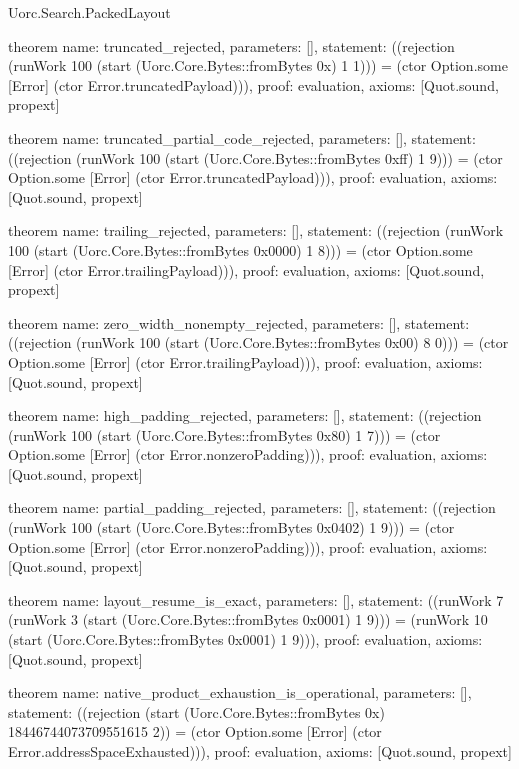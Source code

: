 \begin{lexlean}{Uorc.Search.PackedLayout}
\begin{semanticmodule}
theorem{
  name: truncated_rejected,
  parameters: [],
  statement: ((rejection (runWork 100 (start (Uorc.Core.Bytes::fromBytes 0x) 1 1))) = (ctor Option.some [Error] (ctor Error.truncatedPayload))),
  proof: evaluation{},
  axioms: [Quot.sound, propext]
}

theorem{
  name: truncated_partial_code_rejected,
  parameters: [],
  statement: ((rejection (runWork 100 (start (Uorc.Core.Bytes::fromBytes 0xff) 1 9))) = (ctor Option.some [Error] (ctor Error.truncatedPayload))),
  proof: evaluation{},
  axioms: [Quot.sound, propext]
}

theorem{
  name: trailing_rejected,
  parameters: [],
  statement: ((rejection (runWork 100 (start (Uorc.Core.Bytes::fromBytes 0x0000) 1 8))) = (ctor Option.some [Error] (ctor Error.trailingPayload))),
  proof: evaluation{},
  axioms: [Quot.sound, propext]
}

theorem{
  name: zero_width_nonempty_rejected,
  parameters: [],
  statement: ((rejection (runWork 100 (start (Uorc.Core.Bytes::fromBytes 0x00) 8 0))) = (ctor Option.some [Error] (ctor Error.trailingPayload))),
  proof: evaluation{},
  axioms: [Quot.sound, propext]
}

theorem{
  name: high_padding_rejected,
  parameters: [],
  statement: ((rejection (runWork 100 (start (Uorc.Core.Bytes::fromBytes 0x80) 1 7))) = (ctor Option.some [Error] (ctor Error.nonzeroPadding))),
  proof: evaluation{},
  axioms: [Quot.sound, propext]
}

theorem{
  name: partial_padding_rejected,
  parameters: [],
  statement: ((rejection (runWork 100 (start (Uorc.Core.Bytes::fromBytes 0x0402) 1 9))) = (ctor Option.some [Error] (ctor Error.nonzeroPadding))),
  proof: evaluation{},
  axioms: [Quot.sound, propext]
}

theorem{
  name: layout_resume_is_exact,
  parameters: [],
  statement: ((runWork 7 (runWork 3 (start (Uorc.Core.Bytes::fromBytes 0x0001) 1 9))) = (runWork 10 (start (Uorc.Core.Bytes::fromBytes 0x0001) 1 9))),
  proof: evaluation{},
  axioms: [Quot.sound, propext]
}

theorem{
  name: native_product_exhaustion_is_operational,
  parameters: [],
  statement: ((rejection (start (Uorc.Core.Bytes::fromBytes 0x) 18446744073709551615 2)) = (ctor Option.some [Error] (ctor Error.addressSpaceExhausted))),
  proof: evaluation{},
  axioms: [Quot.sound, propext]
}
\end{semanticmodule}
\end{lexlean}
